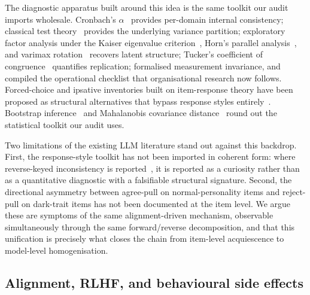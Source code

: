 The diagnostic apparatus built around this idea is the same toolkit our audit imports wholesale. Cronbach's $\alpha$~\citep{cronbach1951coefficient} provides per-domain internal consistency; classical test theory~\citep{lord1968statistical} provides the underlying variance partition; exploratory factor analysis under the Kaiser eigenvalue criterion~\citep{kaiser1960application}, Horn's parallel analysis~\citep{horn1965parallel}, and varimax rotation~\citep{kaiser1958varimax} recovers latent structure; Tucker's coefficient of congruence~\citep{tucker1951method} quantifies replication; \citet{meredith1993measurement} formalised measurement invariance, and \citet{vandenberg2000review} compiled the operational checklist that organisational research now follows. Forced-choice and ipsative inventories built on item-response theory have been proposed as structural alternatives that bypass response styles entirely~\citep{brown2011forcedchoice,treaux2025forced}. Bootstrap inference~\citep{efron1979bootstrap} and Mahalanobis covariance distance~\citep{mahalanobis1936generalised} round out the statistical toolkit our audit uses.

Two limitations of the existing LLM literature stand out against this backdrop. First, the response-style toolkit has not been imported in coherent form: where reverse-keyed inconsistency is reported~\citep{acquiescence2025emnlp}, it is reported as a curiosity rather than as a quantitative diagnostic with a falsifiable structural signature. Second, the directional asymmetry between agree-pull on normal-personality items and reject-pull on dark-trait items has not been documented at the item level. We argue these are symptoms of the same alignment-driven mechanism, observable simultaneously through the same forward/reverse decomposition, and that this unification is precisely what closes the chain from item-level acquiescence to model-level homogenisation.

\subsection{Alignment, RLHF, and behavioural side effects}
\label{sec:related-alignment}


